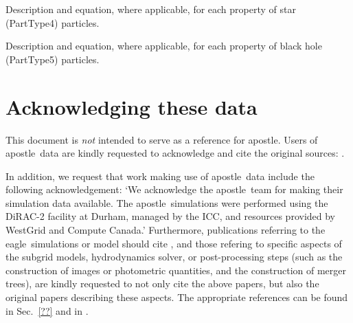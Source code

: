 \documentclass[10pt, a4paper]{article}
\newcommand{\eagle}{{\sc eagle}}
\newcommand{\apostle}{{\sc apostle}}
\begin{document}
\begin{table}
\label{TabStar}
\caption{Description and equation, where applicable, for each property of star (PartType4) particles.}
\begin{center}
\footnotesize
\renewcommand{\arraystretch}{1.5}

\end{center}
\end{table}

\begin{table}
\label{TabBH}
\caption{Description and equation, where applicable, for each property of black hole (PartType5) particles.}
\begin{center}
\footnotesize
\renewcommand{\arraystretch}{1.5}

\end{center}
\end{table}

\section{Acknowledging these data}
This document is \emph{not} intended to serve as a reference for \apostle.  Users of \apostle\ data are kindly requested to acknowledge and cite the original sources: \cite{2016MNRAS.457.1931S,2016MNRAS.457..844F}.

In addition, we request that work making use of \apostle\ data include the following acknowledgement: `We acknowledge the \apostle\ team for making their simulation data available. The \apostle\ simulations were performed using the DiRAC-2 facility at Durham, managed by the ICC, and resources provided by WestGrid and Compute Canada.' Furthermore, publications referring to the \eagle\ simulations or model should cite \cite{2015MNRAS.446..521S,2015MNRAS.450.1937C}, and those refering to specific aspects of the subgrid models, hydrodynamics solver, or post-processing steps (such as the construction of images or photometric quantities, and the construction of merger trees), are kindly requested to not only cite the above papers, but also the original papers describing these aspects. The appropriate references can be found in Sec.~\ref{??} and in \cite{2015MNRAS.446..521S,2015MNRAS.450.1937C}.

\newpage


\end{document}

